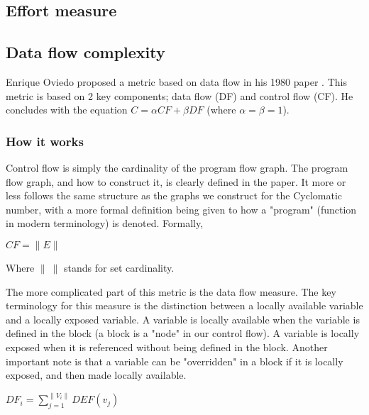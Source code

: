 \documentclass[]{article}
\begin{document}
\cite{ref:cilibrasi2005clustering}

\subsection{Effort measure}

\cite{ref:evaluating_software_complexity_measures}

\subsection{Data flow complexity}

Enrique Oviedo proposed a metric based on data flow in his 1980 paper \cite{ref:oviedo1993control}.
This metric is based on 2 key components; data flow (DF) and control flow (CF).
He concludes with the equation $C = \alpha CF + \beta DF$ (where $\alpha=\beta=1$).

\subsubsection{How it works}

Control flow is simply the cardinality of the program flow graph.
The program flow graph, and how to construct it, is clearly defined in the paper.
It more or less follows the same structure as the graphs we construct for the Cyclomatic number, with a more formal definition being given to how a "program" (function in modern terminology) is denoted.
Formally,

$CF=\parallel E\parallel$

Where $\parallel ~\parallel$ stands for set cardinality.

The more complicated part of this metric is the data flow measure.
The key terminology for this measure is the distinction between a locally available variable and a locally exposed variable.
A variable is locally available when the variable is defined in the block (a block is a "node" in our control flow).
A variable is locally exposed when it is referenced without being defined in the block.
Another important note is that a variable can be "overridden" in a block if it is locally exposed, and then made locally available. 

$DF_i = \sum\limits_{j=1}^{\parallel V_i \parallel} DEF(v_j)$
\end{document}
